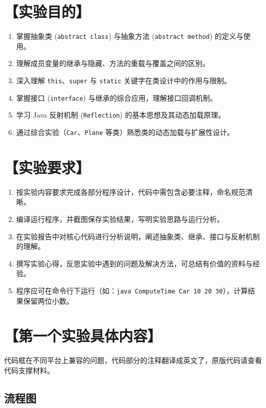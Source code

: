 \documentclass[12pt,a4paper]{article}
\begin{document}
\section*{【实验目的】}
\begin{enumerate}
    \item 掌握抽象类 (\texttt{abstract class}) 与抽象方法 (\texttt{abstract method}) 的定义与使用。
    \item 理解成员变量的继承与隐藏、方法的重载与覆盖之间的区别。
    \item 深入理解 \texttt{this}、\texttt{super} 与 \texttt{static} 关键字在类设计中的作用与限制。
    \item 掌握接口 (\texttt{interface}) 与继承的综合应用，理解接口回调机制。
    \item 学习 Java 反射机制 (\texttt{Reflection}) 的基本思想及其动态加载原理。
    \item 通过综合实验（\texttt{Car}、\texttt{Plane} 等类）熟悉类的动态加载与扩展性设计。
\end{enumerate}

\section*{【实验要求】}
\begin{enumerate}
    \item 按实验内容要求完成各部分程序设计，代码中需包含必要注释，命名规范清晰。
    \item 编译运行程序，并截图保存实验结果，写明实验思路与运行分析。
    \item 在实验报告中对核心代码进行分析说明，阐述抽象类、继承、接口与反射机制的理解。
    \item 撰写实验心得，反思实验中遇到的问题及解决方法，可总结有价值的资料与经验。
    \item 程序应可在命令行下运行（如：\texttt{java ComputeTime Car 10 20 30}），计算结果保留两位小数。
\end{enumerate}

\section*{【第一个实验具体内容】}
代码框在不同平台上兼容的问题，代码部分的注释翻译成英文了，原版代码请查看代码支撑材料。
\subsection*{流程图}
\end{document}
